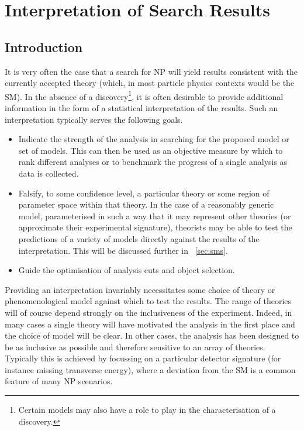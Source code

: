 \chapter{Interpretation of Search Results}
\label{sec:interpretation}
\section{Introduction}
It is very often the case that a search for \ac{NP} will yield results
consistent with the currently accepted theory (which, in most particle physics
contexts would be the \ac{SM}). In the absence of a discovery\footnote{Certain
  models may also have a role to play in the characterisation of a discovery.},
it is often desirable to provide additional information in the form of a
statistical interpretation of the results. Such an interpretation typically
serves the following goals.
\begin{itemize}
\item Indicate the strength of the analysis in searching for the proposed model
  or set of models. This can then be used as an objective measure by which to
  rank different analyses or to benchmark the progress of a single analysis as
  data is collected.
\item Falsify, to some confidence level, a particular theory or some region of
  parameter space within that theory. In the case of a reasonably generic model,
  parameterised in such a way that it may represent other theories (or
  approximate their experimental signature), theorists may be able to
  test the predictions of a variety of models directly against the results of
  the interpretation. This will be discussed further in \sec~\ref{sec:sms}.
\item Guide the optimisation of analysis cuts and object selection.
\end{itemize}

Providing an interpretation invariably necessitates some choice of theory or
phenomenological model against which to test the results. The range of theories
will of course depend strongly on the inclusiveness of the experiment. Indeed,
in many cases a single theory will have motivated the analysis in the first
place and the choice of model will be clear. In other cases, the analysis has
been designed to be as inclusive as possible and therefore sensitive to an array
of theories. Typically this is achieved by focussing on a particular detector
signature (for instance missing transverse energy), where a deviation from the
\ac{SM} is a common feature of many \ac{NP} scenarios.

